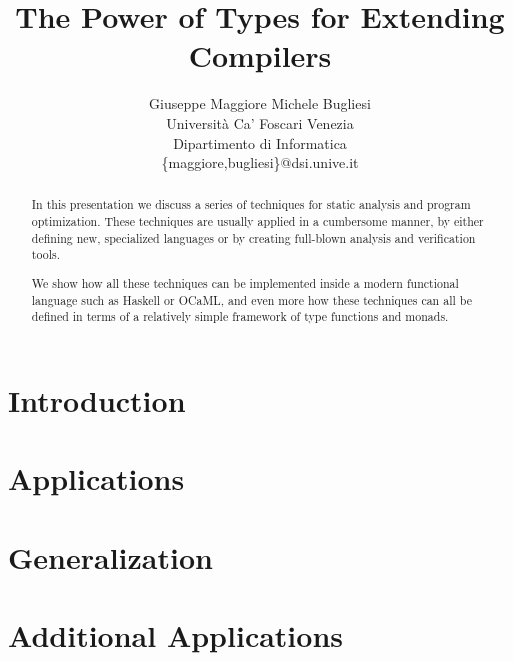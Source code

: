 \documentclass[a4paper]{article}
\begin{document}
\title{\bf The Power of Types for Extending Compilers}

\author{Giuseppe Maggiore \quad Michele Bugliesi
 \\ Universit\`a Ca' Foscari Venezia
 \\ Dipartimento di Informatica 
 \\ \{maggiore,bugliesi\}@dsi.unive.it
}

\date{}
\maketitle

\begin{abstract}
In this presentation we discuss a series of techniques for 
static analysis and program optimization. These techniques
are usually applied in a cumbersome manner, by either
defining new, specialized languages or by creating full-blown
analysis and verification tools.

We show how all these techniques can be implemented inside a
modern functional language such as Haskell or OCaML, and even 
more how these techniques can all be defined in terms of a
relatively simple framework of type functions and monads.
\end{abstract}

\section{Introduction}
\label{sec:intro}
 

\section{Applications}
\label{sec:apps}
 

\section{Generalization}
\label{sec:gen}
 

\section{Additional Applications}
\label{sec:apps}
 


 
\nocite{}
\end{document}
